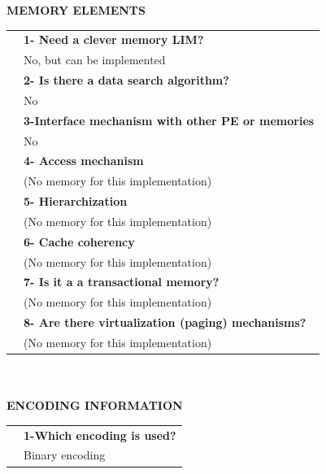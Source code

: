 {\large \textbf{MEMORY ELEMENTS}}\vspace{10pt}\\\begin{tabular}{ p{0.2cm} p{14.5cm}}
	&\textbf{1- Need a clever memory LIM?}\\
	&	No, but can be implemented\vspace{7pt}\\
	&\textbf{2- Is there a data search algorithm?}\\
	&	No\vspace{7pt}\\
	&\textbf{	3-Interface mechanism with other PE or memories}\\
	&	No\vspace{7pt}\\
	&	\textbf{4- Access mechanism}\\
	&	(No memory for this implementation)\vspace{7pt}\\
	&	\textbf{5- Hierarchization} \\
	&	(No memory for this implementation)\vspace{7pt}\\
	&\textbf{	6- Cache coherency} \\
	&	(No memory for this implementation)\vspace{7pt}\\
	&\textbf{	7- Is it a a transactional memory?}\\
	&	(No memory for this implementation)\vspace{7pt}\\
	&\textbf{	8- Are there virtualization (paging) mechanisms?}\\
	&	(No memory for this implementation)\end{tabular}\vspace{14pt}\\
\vspace{10pt}\\
{\large\textbf{ENCODING INFORMATION}}\vspace{10pt}\\
\begin{tabular}{ p{0.2cm} p{14.5cm}}
	&\textbf{1-Which encoding is used?}\\
	&Binary encoding
\end{tabular}
\newpage{\large\textbf{ }}\vspace{10pt}\\
